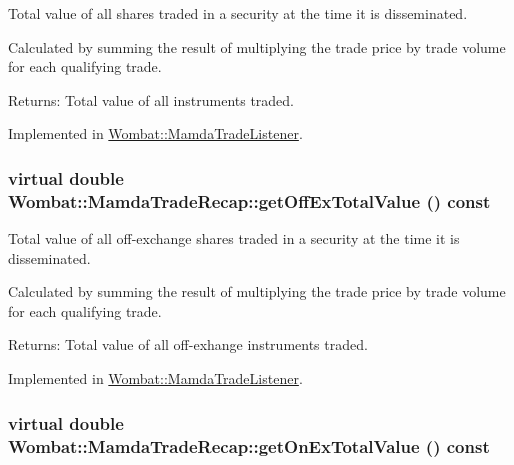 Total value of all shares traded in a security at the time it is disseminated. 

Calculated by summing the result of multiplying the trade price by trade volume for each qualifying trade.

\begin{Desc}
\item[Returns:]Total value of all instruments traded. \end{Desc}


Implemented in \hyperlink{classWombat_1_1MamdaTradeListener_7b7e5520279a385cde727081db1874d3}{Wombat::Mamda\-Trade\-Listener}.\hypertarget{classWombat_1_1MamdaTradeRecap_96ea4f22af059b55175f2fa99696ea80}{
\subsubsection[getOffExTotalValue]{\setlength{\rightskip}{0pt plus 5cm}virtual double Wombat::Mamda\-Trade\-Recap::get\-Off\-Ex\-Total\-Value () const}}
\label{classWombat_1_1MamdaTradeRecap_96ea4f22af059b55175f2fa99696ea80}


Total value of all off-exchange shares traded in a security at the time it is disseminated. 

Calculated by summing the result of multiplying the trade price by trade volume for each qualifying trade.

\begin{Desc}
\item[Returns:]Total value of all off-exhange instruments traded. \end{Desc}


Implemented in \hyperlink{classWombat_1_1MamdaTradeListener_0b0a3e74b09f916b4d202379842a243e}{Wombat::Mamda\-Trade\-Listener}.\hypertarget{classWombat_1_1MamdaTradeRecap_3e76017039351d288886d5f467d9364c}{
\subsubsection[getOnExTotalValue]{\setlength{\rightskip}{0pt plus 5cm}virtual double Wombat::Mamda\-Trade\-Recap::get\-On\-Ex\-Total\-Value () const}}
\label{classWombat_1_1MamdaTradeRecap_3e76017039351d288886d5f467d9364c}


